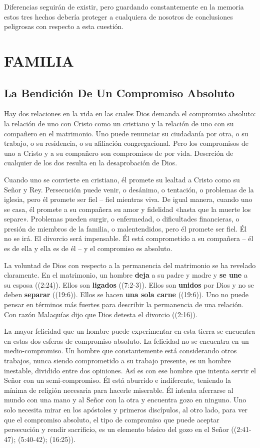\documentclass[12pt, twoside, openright]{book}
\begin{document}
Diferencias seguirán de existir, pero guardando constantemente en la memoria estos tres hechos debería proteger a cualquiera de nosotros de conclusiones peligrosas con respecto a esta cuestión.

\chapter{FAMILIA}
\section{La Bendición De Un Compromiso Absoluto}
Hay dos relaciones en la vida en las cuales Dios demanda el compromiso absoluto: la relación de uno con Cristo como un cristiano y la relación de uno con su compañero en el matrimonio. Uno puede renunciar su ciudadanía por otra, o su trabajo, o su residencia, o su afiliación congregacional. Pero los compromisos de uno a Cristo y a su compañero son compromisos de por vida. Deserción de cualquier de los dos resulta en la desaprobación de Dios.

Cuando uno se convierte en cristiano, él promete su lealtad a Cristo como su Señor y Rey. Persecución puede venir, o desánimo, o tentación, o problemas de la iglesia, pero él promete ser fiel – fiel mientras viva. De igual manera, cuando uno se casa, él promete a su compañera su amor y fidelidad «hasta que la muerte los separe». Problemas pueden surgir, o enfermedad, o dificultades financieras, o presión de miembros de la familia, o malentendidos, pero él promete ser fiel. Él no se irá. El divorcio será impensable. Él está comprometido a su compañera – él es de ella y ella es de él – y el compromiso es absoluto. 

La voluntad de Dios con respecto a la permanencia del matrimonio se ha revelado claramente. En el matrimonio, un hombre \textbf{deja} a su padre y madre y \textbf{se une} a su esposa ((2:24)). Ellos son \textbf{ligados} ((7:2-3)). Ellos son \textbf{unidos} por Dios y no se deben \textbf{separar} ((19:6)). Ellos se hacen \textbf{una sola carne} ((19:6)). Uno no puede pensar en términos más fuertes para describir la permanencia de una relación. Con razón Malaquías dijo que Dios detesta el divorcio ((2:16)).

La mayor felicidad que un hombre puede experimentar en esta tierra se encuentra en estas dos esferas de compromiso absoluto. La felicidad no se encuentra en un medio-compromiso. Un hombre que constantemente está considerando otros trabajos, nunca siendo comprometido a su trabajo presente, es un hombre inestable, dividido entre dos opiniones. Así es con ese hombre que intenta servir el Señor con un semi-compromiso. Él está aburrido e indiferente, teniendo la mínima de religión necesaria para hacerle miserable. Él intenta aferrarse al mundo con una mano y al Señor con la otra y encuentra gozo en ninguno. Uno solo necesita mirar en los apóstoles y primeros discípulos, al otro lado, para ver que el compromiso absoluto, el tipo de compromiso que puede aceptar persecución y rendir sacrificio, es un elemento básico del gozo en el Señor ((2:41-47); (5:40-42); (16:25)).
\end{document}
